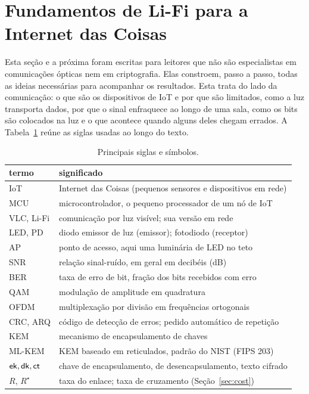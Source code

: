 \section{Fundamentos de Li-Fi para a Internet das Coisas}\label{sec:fund-lifi}
Esta seção e a próxima foram escritas para leitores que não são especialistas
em comunicações ópticas nem em criptografia. Elas constroem, passo a passo,
todas as ideias necessárias para acompanhar os resultados. Esta trata do lado
da comunicação: o que são os dispositivos de IoT e por que são limitados, como
a luz transporta dados, por que o sinal enfraquece ao longo de uma sala, como
os bits são colocados na luz e o que acontece quando alguns deles chegam
errados. A Tabela~\ref{tab:acronyms} reúne as siglas usadas ao longo do texto.

\begin{table}[!htb]
\caption{Principais siglas e símbolos.}
\label{tab:acronyms}
\centering
\small
\begin{tabular}{ll}
\toprule
termo & significado\\
\midrule
IoT        & Internet das Coisas (pequenos sensores e dispositivos em rede)\\
MCU        & microcontrolador, o pequeno processador de um nó de IoT\\
VLC, Li-Fi & comunicação por luz visível; sua versão em rede\\
LED, PD    & diodo emissor de luz (emissor); fotodiodo (receptor)\\
AP         & ponto de acesso, aqui uma luminária de LED no teto\\
SNR        & relação sinal-ruído, em geral em decibéis (dB)\\
BER        & taxa de erro de bit, fração dos bits recebidos com erro\\
QAM        & modulação de amplitude em quadratura\\
OFDM       & multiplexação por divisão em frequências ortogonais\\
CRC, ARQ   & código de detecção de erros; pedido automático de repetição\\
KEM        & mecanismo de encapsulamento de chaves\\
ML-KEM     & KEM baseado em reticulados, padrão do NIST (FIPS 203)\\
$\mathsf{ek},\mathsf{dk},\mathsf{ct}$ & chave de encapsulamento, de desencapsulamento, texto cifrado\\
$R$, $R^{\star}$ & taxa do enlace; taxa de cruzamento (Seção~\ref{sec:cost})\\
\bottomrule
\end{tabular}
\end{table}

